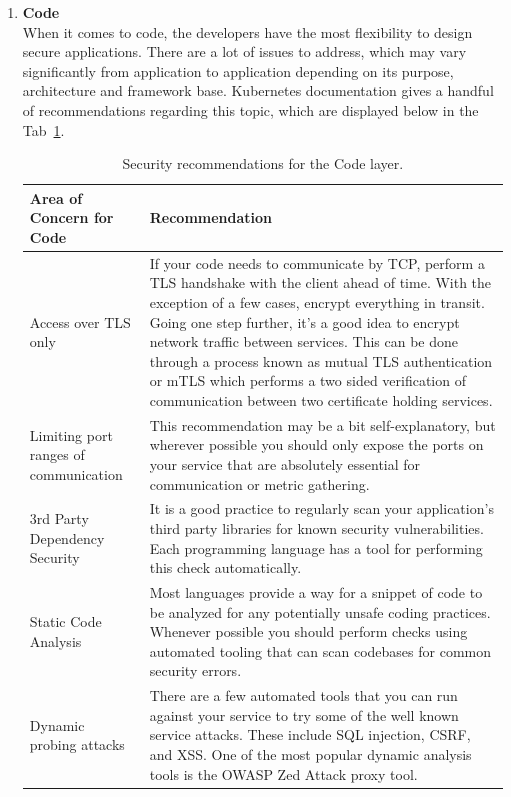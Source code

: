 \begin{enumerate}
\item \textbf{Code} \\
When it comes to code, the developers have the most flexibility to design secure applications. There are a lot of issues to address, which may vary significantly from application to application depending on its purpose, architecture and framework base. Kubernetes documentation gives a handful of recommendations regarding this topic, which are displayed below in the Tab~\ref{tab:code-security-recommendations}.

\begin{table}[H]
    \begin{center}
        \begin{tabular}{ | >{\raggedright\arraybackslash}p{} 
                         | >{\raggedright\arraybackslash}p{} | } 
        \hline
        \textbf{Area of Concern for Code} & \textbf{Recommendation} \\ 
        \hline
        Access over TLS only & If your code needs to communicate by TCP, perform a TLS handshake with the client ahead of time. With the exception of a few cases, encrypt everything in transit. Going one step further, it's a good idea to encrypt network traffic between services. This can be done through a process known as mutual TLS authentication or mTLS which performs a two sided verification of communication between two certificate holding services. \\ 
        \hline
        Limiting port ranges of communication & This recommendation may be a bit self-explanatory, but wherever possible you should only expose the ports on your service that are absolutely essential for communication or metric gathering. \\ 
        \hline
        3rd Party Dependency Security & It is a good practice to regularly scan your application's third party libraries for known security vulnerabilities. Each programming language has a tool for performing this check automatically. \\
        \hline
        Static Code Analysis & Most languages provide a way for a snippet of code to be analyzed for any potentially unsafe coding practices. Whenever possible you should perform checks using automated tooling that can scan codebases for common security errors. \\
        \hline
        Dynamic probing attacks & There are a few automated tools that you can run against your service to try some of the well known service attacks. These include SQL injection, CSRF, and XSS. One of the most popular dynamic analysis tools is the OWASP Zed Attack proxy tool. \\
        \hline
        \end{tabular}
    \end{center}
    \caption{Security recommendations for the Code layer.}
    \label{tab:code-security-recommendations}
\end{table}

\end{enumerate}



